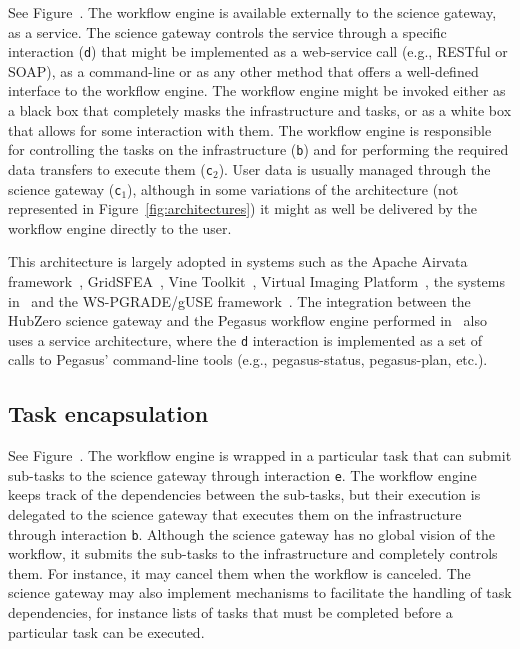 \documentclass[preprint,3p,twocolumn]{elsarticle}
\newcommand{\correction}[1]{\color{blue}#1\color{black}\xspace}
\begin{document}
See Figure~. The workflow engine is available
externally to the science gateway, as a service. The science gateway
controls the service through a specific interaction (\texttt{d}) that
might be implemented as a web-service call (e.g., RESTful or SOAP), as
a command-line or as any other method that offers a well-defined
interface to the workflow engine. The workflow engine might be invoked
either as a black box that completely masks the infrastructure and
tasks, or as a white box that allows for some interaction with
them. The workflow engine is responsible for controlling the tasks on
the infrastructure (\texttt{b}) and for performing the required data
transfers to execute them (\texttt{c$_2$}). User data is usually
managed through the science gateway (\texttt{c$_1$}), although in some
variations of the architecture (not represented in
Figure~\ref{fig:architectures}) it might as well be delivered by the
workflow engine directly to the user. 

This architecture is largely adopted in systems such as
\correction{the} Apache Airvata
\correction{framework}~\cite{marru2011apache},
GridSFEA~\cite{Elts2010}, Vine
Toolkit~\cite{DBLP:journals/scpe/SzejnfeldDKKKKLPTWDNW10}, Virtual
Imaging Platform~\cite{GLAT-13}, the systems
in~\cite{wu2010accelerating,shahand:2012jgc} and the WS-PGRADE/gUSE
framework~\cite{Kacsuk2012}. The integration between the HubZero
science gateway and the Pegasus workflow engine performed
in~\cite{CPE:CPE3257} also uses a service architecture, where the
\texttt{d} interaction is implemented as a set of calls to Pegasus'
command-line tools (e.g., pegasus-status, pegasus-plan, etc.).

\subsection{Task encapsulation}

See Figure~. The workflow engine is wrapped in
a particular task that can submit sub-tasks to the science gateway
through interaction \texttt{e}. The workflow engine keeps track of the
dependencies between the sub-tasks, but their execution is delegated
to the science gateway that executes them on the infrastructure
through interaction \texttt{b}. Although the science gateway has no
global vision of the workflow, it \correction{submits the sub-tasks to the
infrastructure} and completely \correction{controls them}. \correction{For instance, it may cancel} them when the
\correction{workflow} is canceled. The science gateway may also
implement mechanisms to facilitate the handling of task dependencies,
for instance \correction{lists of tasks that must be completed before
  a particular task can be executed}.
\end{document}
